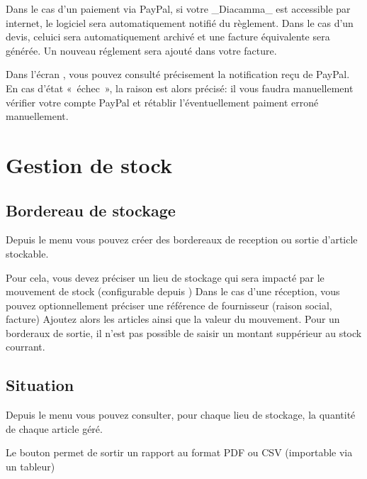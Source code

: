 \documentclass[a4paper,10pt,oneside,french]{sphinxmanual}
\begin{document}
\sphinxAtStartPar
Dans le cas d’un paiement via PayPal, si votre \_Diacamma\_ est accessible par internet, le logiciel sera automatiquement notifié du règlement.
Dans le cas d’un devis, celui\sphinxhyphen{}ci sera automatiquement archivé et une facture équivalente sera générée.
Un nouveau réglement sera ajouté dans votre facture.

\sphinxAtStartPar
Dans l’écran , vous pouvez consulté précisement la notification reçu de PayPal.
En cas d’état « échec », la raison est alors précisé: il vous faudra manuellement vérifier votre compte PayPal et rétablir l’éventuellement paiment erroné manuellement.


\section{Gestion de stock}
\label{\detokenize{invoice/stock:gestion-de-stock}}\label{\detokenize{invoice/stock::doc}}

\subsection{Bordereau de stockage}
\label{\detokenize{invoice/stock:bordereau-de-stockage}}
\sphinxAtStartPar
Depuis le menu  vous pouvez créer des bordereaux de reception ou sortie d’article stockable.

\sphinxAtStartPar
Pour cela, vous devez préciser un lieu de stockage qui sera impacté par le mouvement de stock (configurable depuis )
Dans le cas d’une réception, vous pouvez optionnellement préciser une référence de fournisseur (raison social, facture)
Ajoutez alors les articles ainsi que la valeur du mouvement.
Pour un borderaux de sortie, il n’est pas possible de saisir un montant suppérieur au stock courrant.


\subsection{Situation}
\label{\detokenize{invoice/stock:situation}}
\sphinxAtStartPar
Depuis le menu  vous pouvez consulter, pour chaque lieu de stockage, la quantité de chaque article géré.

\sphinxAtStartPar
Le bouton  permet de sortir un rapport au format PDF ou CSV (importable via un tableur)
\end{document}
